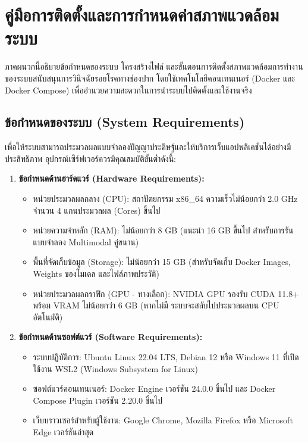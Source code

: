 
\chapter{คู่มือการติดตั้งและการกำหนดค่าสภาพแวดล้อมระบบ}
\label{appendix:installation}

ภาคผนวกนี้อธิบายข้อกำหนดของระบบ โครงสร้างไฟล์ และขั้นตอนการติดตั้งสภาพแวดล้อมการทำงานของระบบสนับสนุนการวินิจฉัยรอยโรคทางช่องปาก โดยใช้เทคโนโลยีคอนเทนเนอร์ (Docker และ Docker Compose) เพื่ออำนวยความสะดวกในการนำระบบไปติดตั้งและใช้งานจริง

\section{ข้อกำหนดของระบบ (System Requirements)}
เพื่อให้ระบบสามารถประมวลผลแบบจำลองปัญญาประดิษฐ์และให้บริการเว็บแอปพลิเคชันได้อย่างมีประสิทธิภาพ อุปกรณ์เซิร์ฟเวอร์ควรมีคุณสมบัติขั้นต่ำดังนี้:

\begin{enumerate}
    \item \textbf{ข้อกำหนดด้านฮาร์ดแวร์ (Hardware Requirements):}
    \begin{itemize}
        \item หน่วยประมวลผลกลาง (CPU): สถาปัตยกรรม x86\_64 ความเร็วไม่น้อยกว่า 2.0 GHz จำนวน 4 แกนประมวลผล (Cores) ขึ้นไป
        \item หน่วยความจำหลัก (RAM): ไม่น้อยกว่า 8 GB (แนะนำ 16 GB ขึ้นไป สำหรับการรันแบบจำลอง Multimodal คู่ขนาน)
        \item พื้นที่จัดเก็บข้อมูล (Storage): ไม่น้อยกว่า 15 GB (สำหรับจัดเก็บ Docker Images, Weights ของโมเดล และไฟล์ภาพประวัติ)
        \item หน่วยประมวลผลกราฟิก (GPU - ทางเลือก): NVIDIA GPU รองรับ CUDA 11.8+ พร้อม VRAM ไม่น้อยกว่า 6 GB (หากไม่มี ระบบจะสลับไปประมวลผลบน CPU อัตโนมัติ)
    \end{itemize}
    \item \textbf{ข้อกำหนดด้านซอฟต์แวร์ (Software Requirements):}
    \begin{itemize}
        \item ระบบปฏิบัติการ: Ubuntu Linux 22.04 LTS, Debian 12 หรือ Windows 11 ที่เปิดใช้งาน WSL2 (Windows Subsystem for Linux)
        \item ซอฟต์แวร์คอนเทนเนอร์: Docker Engine เวอร์ชัน 24.0.0 ขึ้นไป และ Docker Compose Plugin เวอร์ชัน 2.20.0 ขึ้นไป
        \item เว็บบราวเซอร์สำหรับผู้ใช้งาน: Google Chrome, Mozilla Firefox หรือ Microsoft Edge เวอร์ชันล่าสุด
    \end{itemize}
\end{enumerate}

